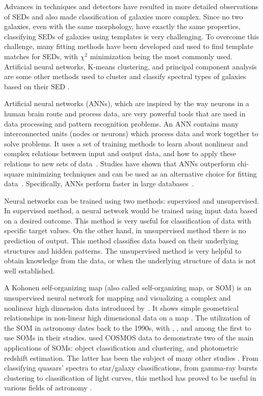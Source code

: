 Advances in techniques and detectors have resulted in more detailed observations of SEDs and also made classification of galaxies more complex.
Since no two galaxies, even with the same morphology, have exactly the same properties, classifying SEDs of galaxies using templates is very challenging.
To overcome this challenge, many fitting methods have been developed and used to find template matches for SEDs, with $\chi^2$ minimization being the most commonly used. 
Artificial neural networks, K-means clustering, and principal component analysis are some other methods used to cluster and classify spectral types of galaxies based on their SED \citep[e.g.][]{Allen13,Ordov14,Shi15}.

Artificial neural networks (ANNs), which are inspired by the way neurons in a human brain route and process data, are very powerful tools that are used in data processing and pattern recognition problems.
An ANN contains many interconnected units (nodes or neurons) which process data and work together to solve problems.
It uses a set of training methods to learn about nonlinear and complex relations between input and output data, and how to apply these relations to new sets of data~\citep[e.g.][]{Hossein14,Hossein16,Ellison16a, Ellison16b}.
Studies have shown that ANNs outperform chi-square minimizing techniques and can be used as an alternative choice for fitting data~\citep[e.g.][]{Marquez91}.
Specifically, ANNs perform faster in large databases~\citep[][]{Gulati97}.

Neural networks can be trained using two methods: supervised and unsupervised.
In supervised method, a neural network would be trained using input data based on a desired outcome.
This method is very useful for classification of data with specific target values.
On the other hand, in unsupervised method there is no prediction of output.
This method classifies data based on their underlying structures and hidden patterns.
The unsupervised method is very helpful to obtain knowledge from the data, or when the underlying structure of data is not well established.

A Kohonen self-organizing map (also called self-organizing map, or SOM) is an unsupervised neural network for mapping and visualizing a complex and nonlinear high dimension data introduced by~\citet{Kohonen82}.
It shows simple geometrical relationships in non-linear high dimensional data on a map \citep{Kohonen98}.
The utilization of the SOM in astronomy dates back to the 1990s, with \citet[][]{Odewahn92}, \citet[][]{Hernandez94}, and \citet[][]{Murtagh95} among the first to use SOMs in their studies.
\citet{Geach12} used COSMOS data to demonstrate two of the main applications of SOMs: object classification and clustering, and photometric redshift estimation. The latter has been the subject of many other studies \citep[e.g.][]{Kind14a}.
From classifying quasars' spectra to star/galaxy classifications, from gamma-ray bursts clustering to classification of light curves, this method has proved to be useful in various fields of astronomy \citep[e.g.][]{Maehoenen95, Miller96, Andreon00, Balastegui01, Rajaniemi02, Brett04, Scaringi09}.


